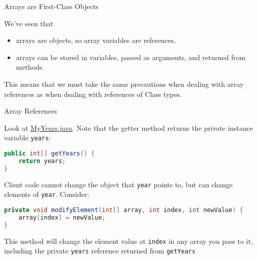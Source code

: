\documentclass{beamer}
\author[Chris Simpkins] 
{Christopher Simpkins \\\texttt{chris.simpkins@gatech.edu}}
\institute[Georgia Tech] %
\date[CS 1331]{}
\title[\course] %
{\lesson}
\subtitle{}
\newcommand{\code}{http://www.cc.gatech.edu/~simpkins/teaching/gatech/cs1331/code}
\begin{document}
\begin{frame}
  \titlepage
\end{frame}



\begin{frame}[fragile]{Arrays are First-Class Objects}


We've seen that
\begin{itemize}
\item arrays are objects, so array variables are references,
\item arrays can be stored in variables, passed as arguments, and returned from methods.
\end{itemize}

This means that we must take the same precautions when dealing with array references as when dealing with references of Class types.

\end{frame}

\begin{frame}[fragile]{Array References}


Look at  \href{\code/MyYears.java}{MyYears.java}. Note that the getter method returns the private instance variable {\tt years}:
\begin{lstlisting}[language=Java]
public int[] getYears() {
    return years;
}
\end{lstlisting}

Client code cannot change the object that {\tt year} points to, but can change elements of {\tt year}.  Consider:
\begin{lstlisting}[language=Java]
private void modifyElement(int[] array, int index, int newValue) {
    array[index] = newValue;
}
\end{lstlisting}
This method will change the element value at {\tt index} in any array you pass to it, including the private {\tt years} reference returned from {\tt getYears}


\end{frame}
\end{document}
